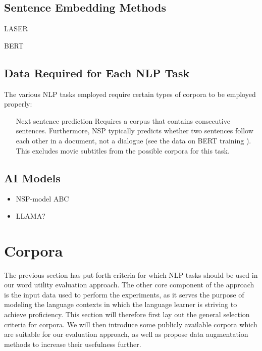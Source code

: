 \subsection{Sentence Embedding Methods}

\begin{description}
	\item[LASER] \cite{artetxeMassivelyMultilingualSentence2019}
	\item[BERT] \cite{reimersMakingMonolingualSentence2020}
\end{description}

\subsection{Data Required for Each NLP Task}
The various NLP tasks employed require certain types of corpora to be employed properly:

\begin{itemize}
	\item[Next sentence prediction]
	      Requires a corpus that contains consecutive sentences.
	      Furthermore, NSP typically predicts whether two sentences follow each other in a document, not a dialogue (see the data on BERT training \cite{kentonBertPretrainingDeep2019}).
	      This excludes movie subtitles from the possible corpora for this task.

\end{itemize}

\subsection{AI Models}
\begin{itemize}
	\item NSP-model ABC
	\item LLAMA?
\end{itemize}



\section{Corpora}
The previous section has put forth criteria for which NLP tasks should be used in our word utility evaluation approach.
The other core component of the approach is the input data used to perform the experiments, as it serves the purpose of modeling the language contexts in which the language learner is striving to achieve proficiency.
This section will therefore first lay out the general selection criteria for corpora.
We will then introduce some publicly available corpora which are suitable for our evaluation approach, as well as propose data augmentation methods to increase their usefulness further.



